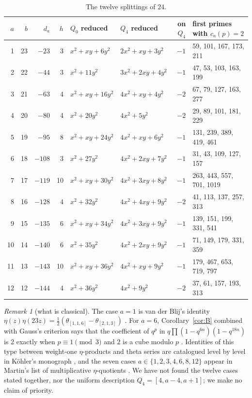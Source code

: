 \documentclass[11pt]{amsart}
\theoremstyle{definition}
\theoremstyle{remark}
\newtheorem{remark}[lemma]{Remark}
\newcommand{\form}[3]{[#1,#2,#3]}
\begin{document}
\begin{table}[h]
\centering\small
\renewcommand{\arraystretch}{1.15}
\begin{tabular}{@{}r r r r l l r l@{}}
\toprule
$a$ & $b$ & $d_a$ & $h$ & $Q_0$ reduced & $Q_4$ reduced & on $Q_4$ & first primes with $c_a(p)=2$\\
\midrule
1  & 23 & $-23$  & 3  & $x^2+xy+6y^2$  & $2x^2+xy+3y^2$  & $-1$ & 59, 101, 167, 173, 211\\
2  & 22 & $-44$  & 3  & $x^2+11y^2$    & $3x^2+2xy+4y^2$ & $-1$ & 47, 53, 103, 163, 199\\
3  & 21 & $-63$  & 4  & $x^2+xy+16y^2$ & $4x^2+xy+4y^2$  & $-2$ & 67, 79, 127, 163, 277\\
4  & 20 & $-80$  & 4  & $x^2+20y^2$    & $4x^2+5y^2$     & $-2$ & 29, 89, 101, 181, 229\\
5  & 19 & $-95$  & 8  & $x^2+xy+24y^2$ & $4x^2+xy+6y^2$  & $-1$ & 131, 239, 389, 419, 461\\
6  & 18 & $-108$ & 3  & $x^2+27y^2$    & $4x^2+2xy+7y^2$ & $-1$ & 31, 43, 109, 127, 157\\
7  & 17 & $-119$ & 10 & $x^2+xy+30y^2$ & $4x^2+3xy+8y^2$ & $-1$ & 263, 443, 557, 701, 1019\\
8  & 16 & $-128$ & 4  & $x^2+32y^2$    & $4x^2+4xy+9y^2$ & $-2$ & 41, 113, 137, 257, 313\\
9  & 15 & $-135$ & 6  & $x^2+xy+34y^2$ & $4x^2+3xy+9y^2$ & $-1$ & 139, 151, 199, 331, 541\\
10 & 14 & $-140$ & 6  & $x^2+35y^2$    & $4x^2+2xy+9y^2$ & $-1$ & 71, 149, 179, 331, 359\\
11 & 13 & $-143$ & 10 & $x^2+xy+36y^2$ & $4x^2+xy+9y^2$  & $-1$ & 179, 467, 653, 719, 797\\
12 & 12 & $-144$ & 4  & $x^2+36y^2$    & $4x^2+9y^2$     & $-2$ & 37, 61, 157, 193, 313\\
\bottomrule
\end{tabular}
\caption{The twelve splittings of $24$.}\label{tab:main}
\end{table}

\begin{remark}[what is classical]\label{rem:known}
The case $a=1$ is van der Blij's identity $\eta(z)\eta(23z)=\frac12(\theta_{[1,1,6]}-\theta_{[2,1,3]})$ \cite{vdB}. For $a=6$, Corollary~\ref{cor:B} combined with Gauss's criterion says that the coefficient of $q^p$ in $q\prod(1-q^{6n})(1-q^{18n})$ is $2$ exactly when $p\equiv1\pmod 3$ and $2$ is a cube modulo $p$ \cite[\S4]{Cox}. Identities of this type between weight-one $\eta$-products and theta series are catalogued level by level in K\"ohler's monograph \cite{Koh}, and the seven cases $a\in\{1,2,3,4,6,8,12\}$ appear in Martin's list of multiplicative $\eta$-quotients \cite{Mar}. We have not found the twelve cases stated together, nor the uniform description $Q_4=\form{4}{a-4}{a+1}$; we make no claim of priority.
\end{remark}
\end{document}
